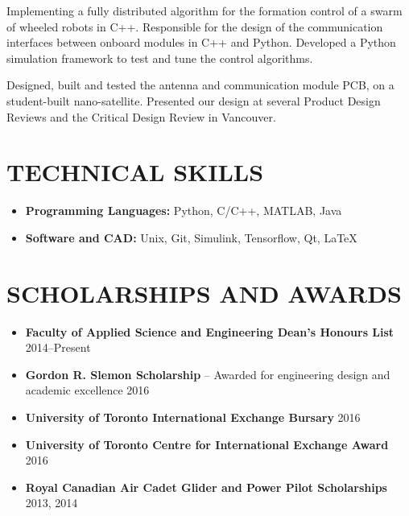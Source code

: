 \documentclass{ResumeTemplate}
\begin{document}
	\workitemsthree
	{Implementing a fully distributed algorithm for the formation control of a swarm of wheeled robots in C++.}
	{Responsible for the design of the communication interfaces between onboard modules in C++ and Python.}
	{Developed a Python simulation framework to test and tune the control algorithms. }
	

	\workitemstwo
	{Designed, built and tested the antenna and communication module PCB, on a student-built nano-satellite.}
	{Presented our design at several Product Design Reviews and the Critical Design Review in Vancouver.}
	
	\section{TECHNICAL SKILLS}
	\raggedright
	\begin{itemize}[noitemsep, leftmargin=*]
		\item \textbf{Programming Languages:} Python, C/C++,  MATLAB, Java \\
		\item \textbf{Software and CAD:} Unix, Git, Simulink, Tensorflow, Qt, LaTeX\\\vspace*{-\baselineskip}
	\end{itemize}
	
	\section{SCHOLARSHIPS AND AWARDS}	
	\begin{itemize}[noitemsep, leftmargin=*]
		\item \textbf{Faculty of Applied Science and Engineering Dean's Honours List} \hfill 2014--Present
		\item \textbf{Gordon R. Slemon Scholarship} -- Awarded for engineering design and academic excellence \hfill 2016
		\item \textbf{University of Toronto International Exchange Bursary} \hfill 2016
		\item \textbf{University of Toronto Centre for International Exchange Award} \hfill 2016
		\item \textbf{Royal Canadian Air Cadet Glider and Power Pilot Scholarships} \hfill 2013, 2014\vspace*{-\baselineskip}
	\end{itemize}
\end{document}
